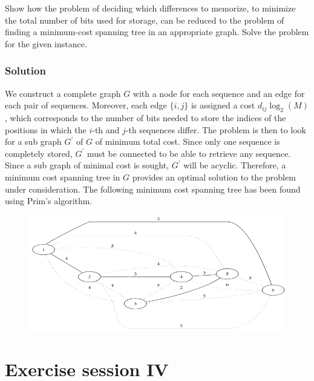 \documentclass[12pt, a4paper]{report}
\begin{document}
        Show how the problem of deciding which differences to memorize, to minimize the total number of bits used for storage, can be reduced to the problem of finding a 
        minimum-cost spanning tree in an appropriate graph. Solve the problem for the given instance. 
    \subsection*{Solution}
        We construct a complete graph $G$ with a node for each sequence and an edge for each pair of sequences. Moreover, each edge $\{i,j\}$ is assigned a cost 
        $d_{ij}\log_2(M)$, which corresponds to the number of bits needed to store the indices of the positions in which the $i$-th and $j$-th sequences differ.
        The problem is then to look for a sub graph $G^{'}$ of $G$ of minimum total cost. Since only one sequence is completely stored, $G^{'}$ must be connected to be 
        able to retrieve any sequence. Since a sub graph of minimal cost is sought, $G^{'}$ will be acyclic. Therefore, a minimum cost spanning tree in $G$ provides an 
        optimal solution to the problem under consideration. The following minimum cost spanning tree has been found using Prim's algorithm. 
        \begin{figure}[H]
            \centering
            \includegraphics[width=1\linewidth]{images/DNA1.png}
        \end{figure}

\newpage

\chapter{Exercise session IV}
\end{document}

